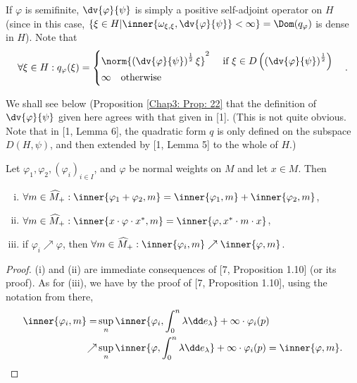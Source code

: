 \begin{remark}
    If $\varphi$ is semifinite, $\dv{\varphi}{\psi}$ is simply a positive self-adjoint operator on $H$ (since in this case, $\{\xi\in H|\inner{\omega_{\xi,\xi},\dv{\varphi}{\psi}}<\infty\}=\Dom(q_\varphi)$ is dense in $H$). Note that
    \begin{equation}\label{Chap3: Eqn: 10}
        \forall \xi\in H:q_\varphi(\xi)=\begin{cases}
            \norm{\left( \dv{\varphi}{\psi} \right)^\frac{1}{2}\xi}^2\quad \text{ if } \xi\in D\left( \left( \dv{\varphi}{\psi} \right)^\frac{1}{2} \right) \\
            \infty\quad \text{otherwise}
        \end{cases}.
    \end{equation}
\end{remark}
We shall see below (Proposition \ref{Chap3: Prop: 22} that the definition of $\dv{\varphi}{\psi}$ given here agrees with that given in [1]. (This is not quite obvious. Note that in [1, Lemma 6], the quadratic form $q$ is only defined on the subspace $D(H,\psi)$, and then extended by [1, Lemma 5] to the whole of $H$.)
\begin{lemma}\label{Chap3: Lemma: 13}
    Let $\varphi_1,\varphi_2,(\varphi_i)_{i\in I}$, and $\varphi$ be normal weights on $M$ and let $x\in M$. Then
    \begin{enumerate}[(i)]
        \item $\forall m\in \widehat{M}_+: \inner{\varphi_1+\varphi_2,m}=\inner{\varphi_1,m}+\inner{\varphi_2,m}$,
        \item $\forall m\in \widehat{M}_+: \inner{x\cdot\varphi\cdot x^*,m}=\inner{\varphi,x^*\cdot m\cdot x}$,
        \item if $\varphi_i\nearrow \varphi$, then $\forall m\in \widehat{M}_+:\inner{\varphi_i,m}\nearrow \inner{\varphi,m}$.
    \end{enumerate}
\end{lemma}
\begin{proof}
    (i) and (ii) are immediate consequences of [7, Proposition 1.10] (or its proof). As for (iii), we have by the proof of [7, Proposition 1.10], using the notation from there,
    \[
        \begin{split}
            \inner{\varphi_i,m}=&\sup_n\inner{\varphi_i,\int_0^n \lambda\dd e_\lambda}+\infty\cdot\varphi_i(p)\\
            \nearrow&\sup_n\inner{\varphi,\int_0^n\lambda\dd e_\lambda}+\infty\cdot\varphi_i(p)=\inner{\varphi,m}.
        \end{split}
    \]
\end{proof}
